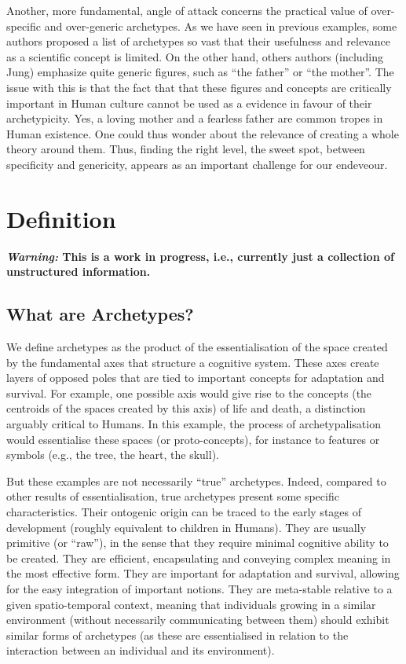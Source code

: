 \documentclass[
]{book}
\begin{document}
Another, more fundamental, angle of attack concerns the practical value of over-specific and over-generic archetypes. As we have seen in previous examples, some authors proposed a list of archetypes so vast that their usefulness and relevance as a scientific concept is limited. On the other hand, others authors (including Jung) emphasize quite generic figures, such as ``the father'' or ``the mother''. The issue with this is that the fact that that these figures and concepts are critically important in Human culture cannot be used as a evidence in favour of their archetypicity. Yes, a loving mother and a fearless father are common tropes in Human existence. One could thus wonder about the relevance of creating a whole theory around them. Thus, finding the right level, the sweet spot, between specificity and genericity, appears as an important challenge for our endeveour.

\hypertarget{definition}{%
\chapter{Definition}\label{definition}}

\textbf{\emph{Warning:} This is a work in progress, i.e., currently just a collection of unstructured information.}

\hypertarget{what-are-archetypes}{%
\section{What are Archetypes?}\label{what-are-archetypes}}

We define archetypes as the product of the essentialisation of the space created by the fundamental axes that structure a cognitive system. These axes create layers of opposed poles that are tied to important concepts for adaptation and survival. For example, one possible axis would give rise to the concepts (the centroids of the spaces created by this axis) of life and death, a distinction arguably critical to Humans. In this example, the process of archetypalisation would essentialise these spaces (or proto-concepts), for instance to features or symbols (e.g., the tree, the heart, the skull).

But these examples are not necessarily ``true'' archetypes. Indeed, compared to other results of essentialisation, true archetypes present some specific characteristics. Their ontogenic origin can be traced to the early stages of development (roughly equivalent to children in Humans). They are usually primitive (or ``raw''), in the sense that they require minimal cognitive ability to be created. They are efficient, encapsulating and conveying complex meaning in the most effective form. They are important for adaptation and survival, allowing for the easy integration of important notions. They are meta-stable relative to a given spatio-temporal context, meaning that individuals growing in a similar environment (without necessarily communicating between them) should exhibit similar forms of archetypes (as these are essentialised in relation to the interaction between an individual and its environment).
\end{document}

